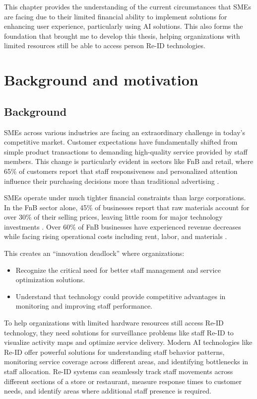 \documentclass[../main.tex]{subfiles}
\begin{document}
This chapter provides the understanding of the current circumstances that SMEs are facing due to their limited financial ability to implement solutions for enhancing user experience, particularly using AI solutions. This also forms the foundation that brought me to develop this thesis, helping organizations with limited resources still be able to access person Re-ID technologies.


\section{Background and motivation}
\label{sec:background}

\subsection{Background}

SMEs across various industries are facing an extraordinary challenge in today's competitive market. Customer expectations have fundamentally shifted from simple product transactions to demanding high-quality service provided by staff members. This change is particularly evident in sectors like \gls{FnB} and retail, where 65\% of customers report that staff responsiveness and personalized attention influence their purchasing decisions more than traditional advertising \cite{customer_experience}.

SMEs operate under much tighter financial constraints than large corporations. In the FnB sector alone, 45\% of businesses report that raw materials account for over 30\% of their selling prices, leaving little room for major technology investments \cite{customer_experience2}. Over 60\% of FnB businesses have experienced revenue decreases while facing rising operational costs including rent, labor, and materials \cite{customer_experience3}.

This creates an ``innovation deadlock'' where organizations:
\begin{itemize}
    \item Recognize the critical need for better staff management and service optimization solutions.
    \item Understand that technology could provide competitive advantages in monitoring and improving staff performance.
\end{itemize}

To help organizations with limited hardware resources still access Re-ID technology, they need solutions for surveillance problems like staff Re-ID to visualize activity maps and optimize service delivery. Modern AI technologies like Re-ID offer powerful solutions for understanding staff behavior patterns, monitoring service coverage across different areas, and identifying bottlenecks in staff allocation. Re-ID systems can seamlessly track staff movements across different sections of a store or restaurant, measure response times to customer needs, and identify areas where additional staff presence is required.
\end{document}
